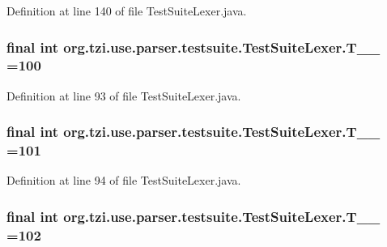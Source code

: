 Definition at line 140 of file Test\-Suite\-Lexer.\-java.

\hypertarget{classorg_1_1tzi_1_1use_1_1parser_1_1testsuite_1_1_test_suite_lexer_a3ea32361a1ad596615775e28d2b85be7}{
\subsubsection[{T\-\_\-\-\_\-100}]{\setlength{\rightskip}{0pt plus 5cm}final int org.\-tzi.\-use.\-parser.\-testsuite.\-Test\-Suite\-Lexer.\-T\-\_\-\-\_ =100\hspace{0.3cm}{\ttfamily [static]}}}\label{classorg_1_1tzi_1_1use_1_1parser_1_1testsuite_1_1_test_suite_lexer_a3ea32361a1ad596615775e28d2b85be7}


Definition at line 93 of file Test\-Suite\-Lexer.\-java.

\hypertarget{classorg_1_1tzi_1_1use_1_1parser_1_1testsuite_1_1_test_suite_lexer_aac475939b5caa82b1a747fe3a1d6a28a}{
\subsubsection[{T\-\_\-\-\_\-101}]{\setlength{\rightskip}{0pt plus 5cm}final int org.\-tzi.\-use.\-parser.\-testsuite.\-Test\-Suite\-Lexer.\-T\-\_\-\-\_ =101\hspace{0.3cm}{\ttfamily [static]}}}\label{classorg_1_1tzi_1_1use_1_1parser_1_1testsuite_1_1_test_suite_lexer_aac475939b5caa82b1a747fe3a1d6a28a}


Definition at line 94 of file Test\-Suite\-Lexer.\-java.

\hypertarget{classorg_1_1tzi_1_1use_1_1parser_1_1testsuite_1_1_test_suite_lexer_a596076f7b771a8de5098b11870634adb}{
\subsubsection[{T\-\_\-\-\_\-102}]{\setlength{\rightskip}{0pt plus 5cm}final int org.\-tzi.\-use.\-parser.\-testsuite.\-Test\-Suite\-Lexer.\-T\-\_\-\-\_ =102\hspace{0.3cm}{\ttfamily [static]}}}\label{classorg_1_1tzi_1_1use_1_1parser_1_1testsuite_1_1_test_suite_lexer_a596076f7b771a8de5098b11870634adb}


